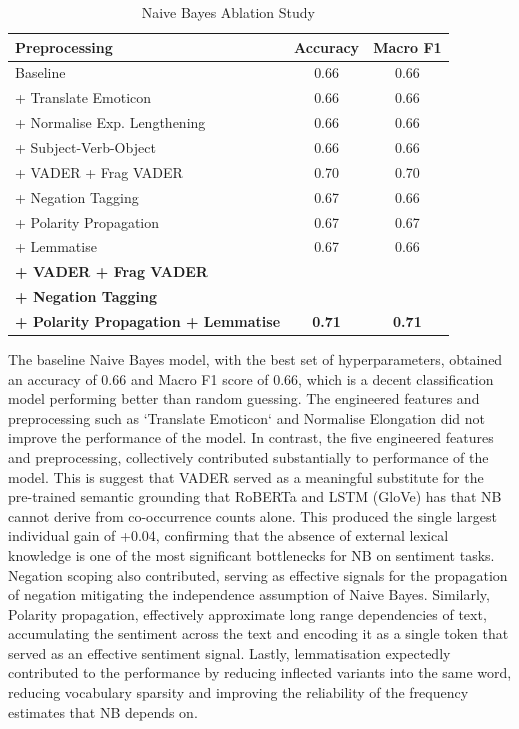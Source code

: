 \documentclass[11pt]{article}
\begin{document}
\begin{table}[h]
\small
\centering
\renewcommand{\arraystretch}{1.2}
\begin{tabular}{p{5.8cm} c c}
\hline
\textbf{Preprocessing} & \textbf{Accuracy} & \textbf{Macro F1} \\
\hline
Baseline & 0.66 & 0.66 \\
\hline
+ Translate Emoticon               & 0.66 & 0.66 \\
+ Normalise Exp. Lengthening       & 0.66 & 0.66 \\
+ Subject-Verb-Object              & 0.66 & 0.66 \\
\hline
+ VADER + Frag VADER               & 0.70 & 0.70 \\
+ Negation Tagging                 & 0.67 & 0.66 \\
+ Polarity Propagation             & 0.67 & 0.67 \\
+ Lemmatise                        & 0.67 & 0.66 \\
\hline
\textbf{+ VADER + Frag VADER}      &      & \\
\textbf{+ Negation Tagging}        &      & \\
\textbf{+ Polarity Propagation + Lemmatise} & \textbf{0.71} & \textbf{0.71} \\
\hline
\end{tabular}
\caption{Naive Bayes Ablation Study}
\label{tab:nb_ablation}
\end{table}

The baseline Naive Bayes model, with the best set of hyperparameters, obtained an accuracy of 0.66 and Macro F1 score of 0.66, which is a decent classification model performing better than random guessing.
The engineered features and preprocessing such as `Translate Emoticon` and Normalise Elongation did not improve the performance of the model.
In contrast, the five engineered features and preprocessing, collectively contributed substantially to performance of the model. 
This is suggest that VADER served as a meaningful substitute for the pre-trained semantic grounding that RoBERTa and LSTM (GloVe) has that NB cannot derive from co-occurrence counts alone. This produced the single largest individual gain of +0.04, confirming that the absence of external lexical knowledge is one of the most significant bottlenecks for NB on sentiment tasks.
Negation scoping also contributed, serving as effective signals for the propagation of negation mitigating the independence assumption of Naive Bayes.
Similarly, Polarity propagation, effectively approximate long range dependencies of text, accumulating the sentiment across the text and encoding it as a single token that served as an effective sentiment signal.
Lastly, lemmatisation expectedly contributed to the performance by reducing inflected variants into the same word, reducing vocabulary sparsity and improving the reliability of the frequency estimates that NB depends on.
\end{document}
